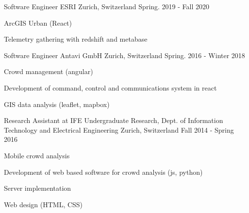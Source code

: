 

\begin{cventries}

  \cventry
    {Software Engineer} %
    {ESRI} %
    {Zurich, Switzerland} %
    {Spring. 2019 - Fall 2020} %
    {
      \begin{cvitems} %
        \item {ArcGIS Urban (React) }
        \item {Telemetry gathering with redshift and metabase}
      \end{cvitems}
    }

  \cventry
    {Software Engineer} %
    {Antavi GmbH} %
    {Zurich, Switzerland} %
    {Spring. 2016 - Winter 2018} %
    {
      \begin{cvitems} %
        \item {Crowd management (angular)}
        \item {Development of command, control and communications system in react }
        \item {GIS data analysis (leaflet, mapbox)}
      \end{cvitems}
    }

  \cventry
    {Research Assistant at IFE} %
    {Undergraduate Research, Dept. of Information Technology and Electrical Engineering} %
    {Zurich, Switzerland} %
    {Fall 2014 - Spring 2016} %
    {
      \begin{cvitems} %
        \item {Mobile crowd analysis }
        \item {Development of web based software for crowd analysis (js, python)}
        \item {Server implementation}
        \item {Web design (HTML, CSS)}
      \end{cvitems}
    }


\end{cventries}
